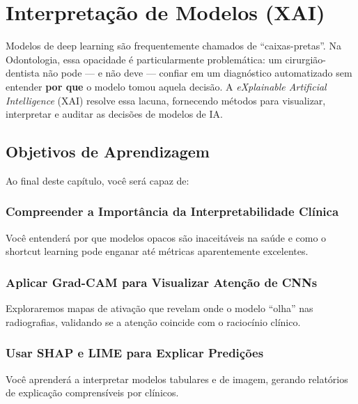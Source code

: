 \chapter{Interpretação de Modelos (XAI)}
\label{cap:interpretacao-modelos}
\nivelquatro

Modelos de deep learning são frequentemente chamados de ``caixas-pretas''.
Na Odontologia, essa opacidade é particularmente problemática: um
cirurgião-dentista não pode — e não deve — confiar em um diagnóstico
automatizado sem entender \textbf{por que} o modelo tomou aquela decisão.
A \textit{eXplainable Artificial Intelligence} (XAI) resolve essa lacuna,
fornecendo métodos para visualizar, interpretar e auditar as decisões
de modelos de IA.

 

\section{Objetivos de Aprendizagem}

Ao final deste capítulo, você será capaz de:

\subsection{Compreender a Importância da Interpretabilidade Clínica}
Você entenderá por que modelos opacos são inaceitáveis na saúde e como o shortcut learning pode enganar até métricas aparentemente excelentes.

\subsection{Aplicar Grad-CAM para Visualizar Atenção de CNNs}
Exploraremos mapas de ativação que revelam onde o modelo ``olha'' nas radiografias, validando se a atenção coincide com o raciocínio clínico.

\subsection{Usar SHAP e LIME para Explicar Predições}
Você aprenderá a interpretar modelos tabulares e de imagem, gerando relatórios de explicação comprensíveis por clínicos.

